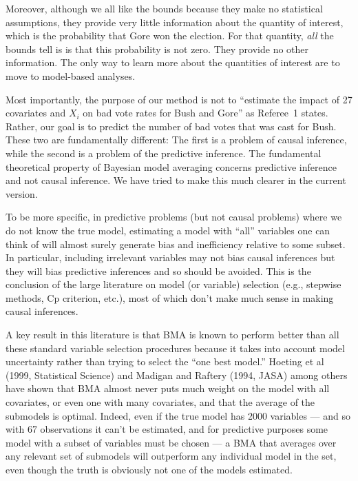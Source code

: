 \documentclass[11pt]{article}
\begin{document}
\begin{enumerate}
  Moreover, although we all like the bounds because they make no
  statistical assumptions, they provide very little information about
  the quantity of interest, which is the probability that Gore won the
  election.  For that quantity, \emph{all} the bounds tell is is that
  this probability is not zero.  They provide no other information.
  The only way to learn more about the quantities of interest are to
  move to model-based analyses.
  
  Most importantly, the purpose of our method is not to ``estimate the
  impact of 27 covariates and $X_i$ on bad vote rates for Bush and
  Gore'' as Referee~1 states. Rather, our goal is to predict the
  number of bad votes that was cast for Bush.  These two are
  fundamentally different: The first is a problem of causal inference,
  while the second is a problem of the predictive inference. The
  fundamental theoretical property of Bayesian model averaging
  concerns predictive inference and not causal inference.  We have
  tried to make this much clearer in the current version.
  
  To be more specific, in predictive problems (but not causal
  problems) where we do not know the true model, estimating a model
  with ``all'' variables one can think of will almost surely generate
  bias and inefficiency relative to some subset.  In particular,
  including irrelevant variables may not bias causal inferences but
  they will bias predictive inferences and so should be avoided.  This
  is the conclusion of the large literature on model (or variable)
  selection (e.g., stepwise methods, Cp criterion, etc.), most of
  which don't make much sense in making causal inferences.
  
  A key result in this literature is that BMA is known to perform
  better than all these standard variable selection procedures because
  it takes into account model uncertainty rather than trying to select
  the ``one best model.''  Hoeting et al (1999, Statistical Science)
  and Madigan and Raftery (1994, JASA) among others have shown that
  BMA almost never puts much weight on the model with all covariates,
  or even one with many covariates, and that the average of the
  submodels is optimal.  Indeed, even if the true model has 2000
  variables --- and so with 67 observations it can't be estimated, and
  for predictive purposes some model with a subset of variables must
  be chosen --- a BMA that averages over any relevant set of submodels
  will outperform any individual model in the set, even though the
  truth is obviously not one of the models estimated.
  

\end{enumerate}
\end{document}

